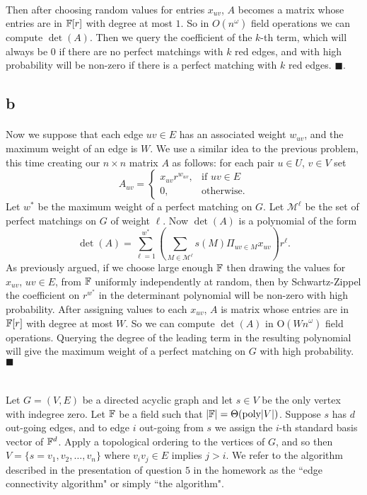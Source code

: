 \documentclass[letterpaper,12pt,oneside,onecolumn]{article}
\newcommand{\cM}{\mathcal{M}} \newcommand{\cN}{\mathcal{N}}
\begin{document}
\paragraph{}
Then after choosing random values for entries $x_{uv}$, $A$ becomes a matrix whose entries are in $\mathbb{F}[r]$ with degree at most $1$. So in $O(n^\omega)$ field operations we can compute $\det(A)$. Then we query the coefficient of the $k$-th term, which will always be $0$ if there are no perfect matchings with $k$ red edges, and with high probability will be non-zero if there is a perfect matching with $k$ red edges. $\blacksquare$.
\subsection{b}
\paragraph{}
Now we suppose that each edge $uv \in E$ has an associated weight $w_{uv}$, and the maximum weight of an edge is $W$. We use a similar idea to the previous problem, this time creating our $n\times n$ matrix $A$ as follows: for each pair $u \in U$, $v\in V$ set
$$A_{uv} = \begin{cases}
	x_{uv}r^{w_{uv}}, &\text{if $uv \in E$} \\
	0, &\text{otherwise.}
	\end{cases}$$
Let $w^*$ be the maximum weight of a perfect matching on $G$. Let $\cM^\ell$ be the set of perfect matchings on $G$ of weight $\ell$. Now $\det(A)$ is a polynomial of the form
$$\det(A) = \sum_{\ell = 1}^{w^*} (\sum_{M \in \cM^\ell} s(M)\Pi_{uv \in M}x_{uv})r^\ell.$$
As previously argued, if we choose large enough $\mathbb{F}$ then drawing the values for $x_{uv}$, $uv \in E$, from $\mathbb{F}$ uniformly independently at random, then by Schwartz-Zippel the coefficient on $r^{w^*}$ in the determinant polynomial will be non-zero with high probability. After assigning values to each $x_{uv}$, $A$ is matrix whose entries are in $\mathbb{F}[r]$ with degree at most $W$. So we can compute $\det(A)$ in O$(Wn^\omega)$ field operations. Querying the degree of the leading term in the resulting polynomial will give the maximum weight of a perfect matching on $G$ with high probability. $\blacksquare$
\newpage
\section{}
\paragraph{}
Let $G=(V,E)$ be a directed acyclic graph and let $s \in V$ be the only vertex with indegree zero. Let $\mathbb{F}$ be a field such that $|\mathbb{F}| = \Theta(\text{poly}|V|)$. Suppose $s$ has $d$ out-going edges, and to edge $i$ out-going from $s$ we assign the $i$-th standard basis vector of $\mathbb{F}^d$. Apply a topological ordering to the vertices of $G$, and so then $V = \{s=v_1, v_2, \dots, v_n\}$ where $v_iv_j \in E$ implies $j>i$. We refer to the algorithm described in the presentation of question $5$ in the homework as the ``edge connectivity algorithm" or simply ``the algorithm".
\end{document}
